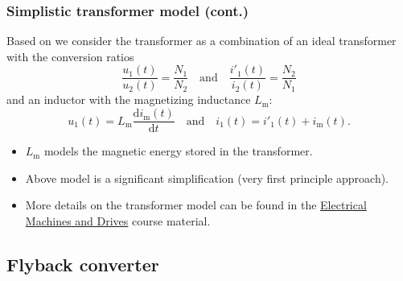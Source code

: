 \begin{frame}
    \frametitle{Simplistic transformer model (cont.)}
    Based on  we consider the transformer as a combination of an ideal transformer with the conversion ratios
    \begin{equation}
        \frac{u_1(t)}{u_2(t)} = \frac{N_1}{N_2} \quad \text{and} \quad \frac{i'_1(t)}{i_2(t)} = \frac{N_2}{N_1}
    \end{equation}
    and an inductor with the magnetizing inductance $L_\mathrm{m}$:
    \begin{equation}
        u_1(t) = L_\mathrm{m} \frac{\mathrm{d}i_\mathrm{m}(t)}{\mathrm{d}t} \quad \text{and} \quad i_1(t) = i'_1(t) + i_\mathrm{m}(t).
    \end{equation}
    \begin{itemize}
        \item $L_\mathrm{m}$ models the magnetic energy stored in the transformer.
        \item Above model is a significant simplification (very first principle approach).
        \item More details on the transformer model can be found in the \href{https://github.com/IAS-Uni-Siegen/EMD_course}{Electrical Machines and Drives} course material.
    \end{itemize}
\end{frame}

\subsection{Flyback converter}

